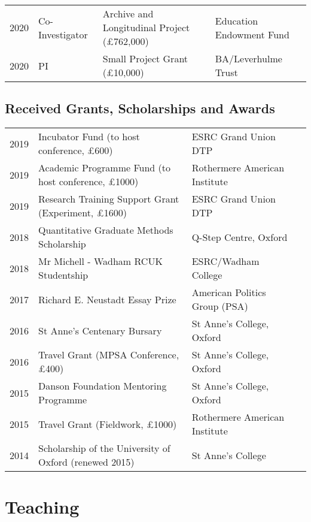 \documentclass[11pt, a4paper]{article}
\begin{document}
\begin{tabular}{llll}
	 2020 & Co-Investigator & Archive and Longitudinal Project (£762,000) & Education Endowment Fund \\
     2020 & PI & Small Project Grant (£10,000) & BA/Leverhulme Trust
 \end{tabular}

\subsection*{Received Grants, Scholarships and Awards}
 \begin{tabular}{llll}
     2019 & Incubator Fund (to host conference, £600) & ESRC Grand Union DTP \\
     2019 & Academic Programme Fund (to host conference, £1000) & Rothermere American Institute \\
     2019 & Research Training Support Grant (Experiment, £1600) & ESRC Grand Union DTP \\
     2018 & Quantitative Graduate Methods Scholarship & Q-Step Centre, Oxford \\
     2018 & Mr Michell - Wadham RCUK Studentship & ESRC/Wadham College\\
     2017 & Richard E. Neustadt Essay Prize & American Politics Group (PSA) \\
     2016 & St Anne's Centenary Bursary & St Anne's College, Oxford \\
     2016 & Travel Grant (MPSA Conference, £400) & St Anne's College, Oxford \\
     2015 & Danson Foundation Mentoring Programme & St Anne's College, Oxford \\
     2015 & Travel Grant (Fieldwork, £1000) & Rothermere American Institute \\
     2014 & Scholarship of the University of Oxford (renewed 2015) & St Anne's College

 \end{tabular}

 \section*{Teaching}
\end{document}
